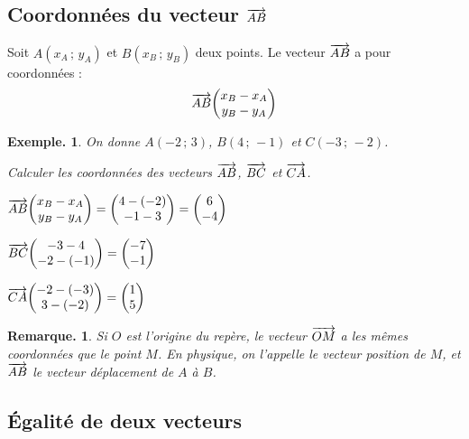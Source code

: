 \documentclass[12pt]{article}
\theoremstyle{break}
\newtheorem*{example}{Exemple.}
\newtheorem*{remark}{Remarque.}
\begin{document}
\subsection{Coordonnées du vecteur $\overrightarrow{AB}$}

\begin{proposition}{}{}
  \begin{multihide}
    Soit $A(x_A\,;\,y_A)$ et $B(x_B\,;\,y_B)$ deux points. Le vecteur $\overrightarrow{AB}$ a pour coordonnées :
    \[
      \wvec{AB}\col{x_B - x_A}{y_B - y_A}
    \]
  \end{multihide}
\end{proposition}

\begin{example}
  \begin{minipage}{0.55\linewidth}
    On donne $A(-2\,;\,3)$, $B(4\,;\,-1)$ et $C(-3\,;\,-2)$.

    Calculer les coordonnées des vecteurs $\overrightarrow{AB}$, $\overrightarrow{BC}$ et $\overrightarrow{CA}$.
    \begin{reponse}
      $\wvec{AB}\col{x_B - x_A}{y_B - y_A} = \col{4-(-2)}{-1-3} = \col{6}{-4}$

      \smallskip
      $\wvec{BC}\col{-3-4}{-2-(-1)} = \col{-7}{-1}$

      \smallskip
      $\wvec{CA}\col{-2-(-3)}{3-(-2)} = \col{1}{5}$
    \end{reponse}
  \end{minipage}
  \hfill
  \begin{minipage}{0.42\linewidth}
    \begin{center}
    \end{center}
  \end{minipage}
\end{example}

\begin{remark}
  Si $O$ est l'origine du repère, le vecteur $\overrightarrow{OM}$ a les mêmes coordonnées que le point $M$. En physique, on l'appelle le \emph{vecteur position} de $M$, et $\overrightarrow{AB}$ le \emph{vecteur déplacement} de $A$ à $B$.
\end{remark}

\subsection{Égalité de deux vecteurs}
\end{document}
